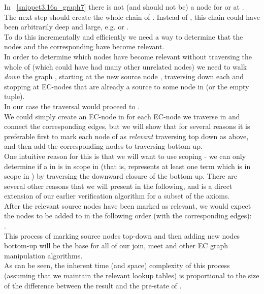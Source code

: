 In ~\ref{snippet3.16a_graph7} there is not (and should not be) a node for  or  at .\\
The next step should create the whole chain of . 
Instead of , this chain could have been arbitrarily deep and large, e.g.  or .\\
To do this incrementally and efficiently we need a way to determine that the nodes
  and the corresponding \GFAs{} have become relevant.\\
In order to determine which nodes have become relevant without traversing the whole of  (which could have had many other unrelated nodes) we need to walk \emph{down} the graph ,
starting at the new source node , traversing down each \gfa and stopping at EC-nodes that are already a source to some node in  (or the empty tuple).\\
In our case the traversal would proceed to .\\
We could simply create an EC-node in  for each EC-node we traverse in  
and connect the corresponding \GFA{} edges, but we will show that for several reasons it is preferable
first to mark each node of  as \emph{relevant} traversing top down as above, 
and then add the corresponding nodes to  traversing bottom up.\\
One intuitive reason for this is that we will want to use scoping - 
we can only determine if a \GFA{} in  is in scope in  (that is, represents at least one term which is in scope in ) by traversing the downward closure of the \GFA{} bottom up. There are several other reasons that we will present in the following, and is a direct extension of our earlier verification algorithm for a subset of the axioms.\\
After the relevant source nodes have been marked as relevant, we would expect the nodes to be added to  in the following order (with the corresponding \GFA{} edges):\\
.\\
This process of marking source nodes top-down and then adding new nodes bottom-up will be the base for all of our join, meet and other EC graph manipulation algorithms.\\
As can be seen, the inherent time (and space) complexity of this process (assuming that we maintain the relevant lookup tables) is proportional to the size of the difference between the result  and the pre-state of .
